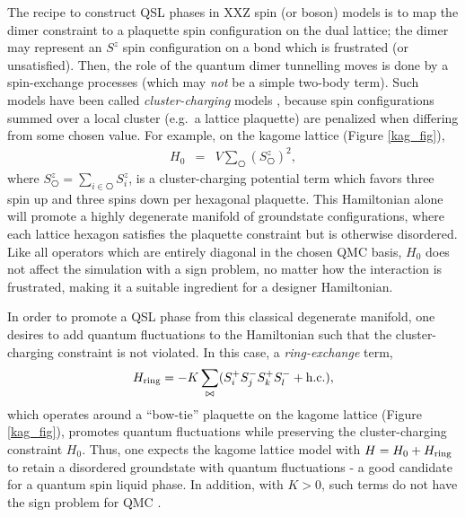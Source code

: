 \documentclass[range]{ar2e}
\begin{document}
The recipe to construct QSL phases in XXZ spin (or boson) models is to map the dimer constraint to a plaquette spin configuration on the dual lattice; the dimer may represent an $S^z$ spin configuration on a bond which is frustrated (or unsatisfied).  Then, the role of the quantum dimer tunnelling moves is done by a spin-exchange processes (which may {\it not} be a simple two-body term).  Such models have been called
{\it cluster-charging} models \cite{Isakov2}, because spin configurations summed over a local cluster (e.g.~a lattice plaquette) are penalized when differing from some chosen value.  For example, on the kagome lattice (Figure \ref{kag_fig}),
\begin{eqnarray}
H_0 &=& V \sum_{\hexagon} (S^z_{\hexagon})^2,  \label{H0}
\end{eqnarray}
where $S^z_{\hexagon} = \sum_{i \in \hexagon}S^z_i$,
is a cluster-charging potential term which favors three spin up and three spins down per hexagonal plaquette.  This Hamiltonian alone will promote a highly degenerate manifold of groundstate configurations, where each lattice hexagon satisfies the plaquette constraint but is otherwise disordered.  
Like all operators which are entirely diagonal in the chosen QMC basis, $H_0$ does not affect the simulation with a sign problem, no matter how the interaction is frustrated, making it a suitable ingredient for a designer Hamiltonian.

In order to promote a QSL phase from this classical degenerate manifold, one desires to add quantum fluctuations to the Hamiltonian such that the cluster-charging constraint is not violated.  In this case, a {\it ring-exchange} term, 
\begin{eqnarray}
H_{\rm ring} = -K \sum_{\bowtie} ( S_i^{+} S_j^{-} S_k^{+} S_l^{-} + {\rm h.c.} ),
\end{eqnarray} 
which operates around a ``bow-tie'' plaquette on the kagome lattice (Figure \ref{kag_fig}),
promotes quantum fluctuations while preserving the cluster-charging constraint $H_0$.  Thus, one expects the kagome lattice model with $H = H_0 + H_{\rm ring}$ to retain a disordered groundstate with quantum fluctuations - a good candidate for a quantum spin liquid phase.  In addition, with $K>0$, such terms do not have the sign problem for QMC \cite{JKqmc}.
\end{document}
